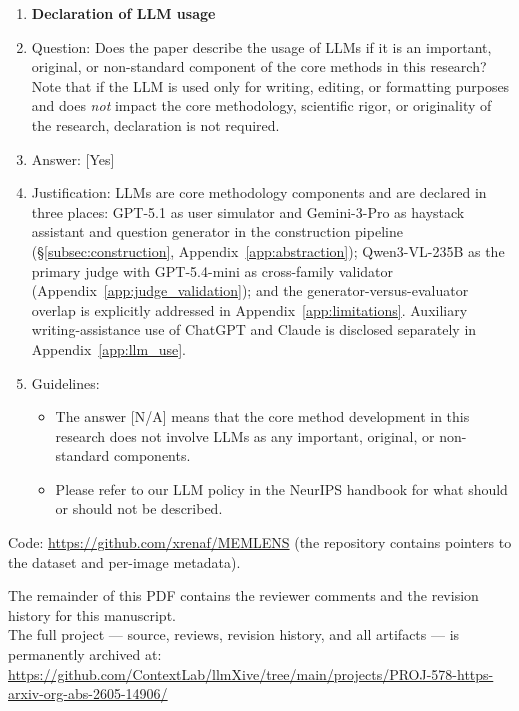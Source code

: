 \documentclass{llmxive}
\providecommand{\answerYes}[1][]{[Yes]#1}
\providecommand{\answerNA}[1][]{[N/A]#1}
\begin{document}
\begin{enumerate}
\item {\bf Declaration of LLM usage}
    \item[] Question: Does the paper describe the usage of LLMs if it is an important, original, or non-standard component of the core methods in this research? Note that if the LLM is used only for writing, editing, or formatting purposes and does \emph{not} impact the core methodology, scientific rigor, or originality of the research, declaration is not required.
    \item[] Answer: \answerYes{}
    \item[] Justification: LLMs are core methodology components and are declared in three places: GPT-5.1 as user simulator and Gemini-3-Pro as haystack assistant and question generator in the construction pipeline (\S\ref{subsec:construction}, Appendix~\ref{app:abstraction}); Qwen3-VL-235B as the primary judge with GPT-5.4-mini as cross-family validator (Appendix~\ref{app:judge_validation}); and the generator-versus-evaluator overlap is explicitly addressed in Appendix~\ref{app:limitations}. Auxiliary writing-assistance use of ChatGPT and Claude is disclosed separately in Appendix~\ref{app:llm_use}.
    \item[] Guidelines:
    \begin{itemize}
        \item The answer \answerNA{} means that the core method development in this research does not involve LLMs as any important, original, or non-standard components.
        \item Please refer to our LLM policy in the NeurIPS handbook for what should or should not be described.
    \end{itemize}

\end{enumerate}
\fi %

\bigskip
\noindent Code: \url{https://github.com/xrenaf/MEMLENS} (the repository contains pointers to the dataset and per-image metadata).


\clearpage
\thispagestyle{empty}
\null\vfill
\begin{center}
{\large The remainder of this PDF contains the reviewer comments and the revision history for this manuscript.}\\[2.5em]
{\normalsize The full project --- source, reviews, revision history, and all artifacts --- is permanently archived at:}\\[0.6em]
\url{https://github.com/ContextLab/llmXive/tree/main/projects/PROJ-578-https-arxiv-org-abs-2605-14906/}
\end{center}
\vfill\null
\clearpage
\end{document}
